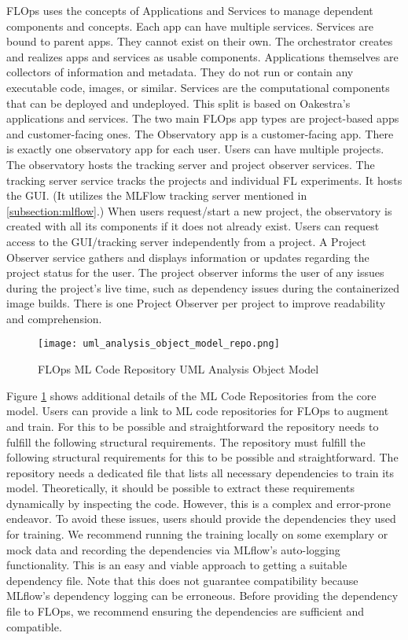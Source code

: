 FLOps uses the concepts of Applications and Services to manage dependent components and concepts.
Each app can have multiple services.
Services are bound to parent apps.
They cannot exist on their own.
The orchestrator creates and realizes apps and services as usable components.
Applications themselves are collectors of information and metadata.
They do not run or contain any executable code, images, or similar.
Services are the computational components that can be deployed and undeployed.
This split is based on Oakestra's applications and services.
The two main FLOps app types are project-based apps and customer-facing ones.
The Observatory app is a customer-facing app.
There is exactly one observatory app for each user.
Users can have multiple projects.
The observatory hosts the tracking server and project observer services.
The tracking server service tracks the projects and individual FL experiments.
It hosts the GUI. 
(It utilizes the MLFlow tracking server mentioned in \ref{subsection:mlflow}.)
When users request/start a new project, the observatory is created with all its components if it does not already exist.
Users can request access to the GUI/tracking server independently from a project.
A Project Observer service gathers and displays information or updates regarding the project status for the user.
The project observer informs the user of any issues during the project's live time, such as dependency issues during the containerized image builds.
There is one Project Observer per project to improve readability and comprehension.

\begin{figure}[h]
    \centering
    \texttt{[image: uml\_analysis\_object\_model\_repo.png]}
    \caption{FLOps ML Code Repository UML Analysis Object Model}
    \label{fig:uml_repo_analysis_object_model}
\end{figure}

Figure \ref{fig:uml_repo_analysis_object_model} shows additional details of the ML Code Repositories from the core model.
Users can provide a link to ML code repositories for FLOps to augment and train.
For this to be possible and straightforward the repository needs to fulfill the following structural requirements.
The repository must fulfill the following structural requirements for this to be possible and straightforward.
The repository needs a dedicated file that lists all necessary dependencies to train its model.
Theoretically, it should be possible to extract these requirements dynamically by inspecting the code.
However, this is a complex and error-prone endeavor.
To avoid these issues, users should provide the dependencies they used for training.
We recommend running the training locally on some exemplary or mock data and recording the dependencies via MLflow's auto-logging functionality.
This is an easy and viable approach to getting a suitable dependency file.
Note that this does not guarantee compatibility because MLflow's dependency logging can be erroneous.
Before providing the dependency file to FLOps, we recommend ensuring the dependencies are sufficient and compatible.

